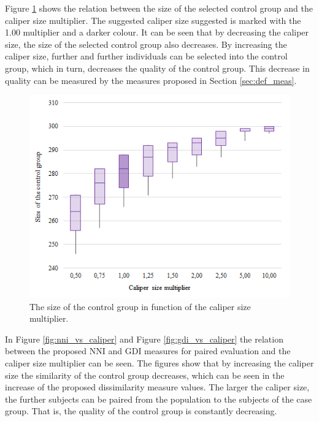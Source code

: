   Figure \ref{fig:size_vs_caliper} shows the relation between the size of the selected control group and the caliper size multiplier. The suggested caliper size suggested is marked with the 1.00 multiplier and a darker colour. It can be seen that by decreasing the caliper size, the size of the selected control group also decreases. By increasing the caliper size, further and further individuals can be selected into the control group, which in turn, decreases the quality of the control group. This decrease in quality can be measured by the measures proposed in Section \ref{sec:def_meas}.
				  
		\begin{figure}[h]
			\centering
                \captionsetup{justification=centering}
			\includegraphics[width=0.6\linewidth]{assets/figures/control_group_selection/measures/size_vs_caliper.png}
                \caption{The size of the control group in function of the caliper size multiplier.}
			\label{fig:size_vs_caliper}
		\end{figure}
				  
		In Figure \ref{fig:nni_vs_caliper} and Figure \ref{fig:gdi_vs_caliper} the relation between the proposed NNI and GDI measures for paired evaluation and the caliper size multiplier can be seen. The figures show that by increasing the caliper size the similarity of the control group decreases, which can be seen in the increase of the proposed dissimilarity measure values. The larger the caliper size, the further subjects can be paired from the population to the subjects of the case group. That is, the quality of the control group is constantly decreasing. %
								
